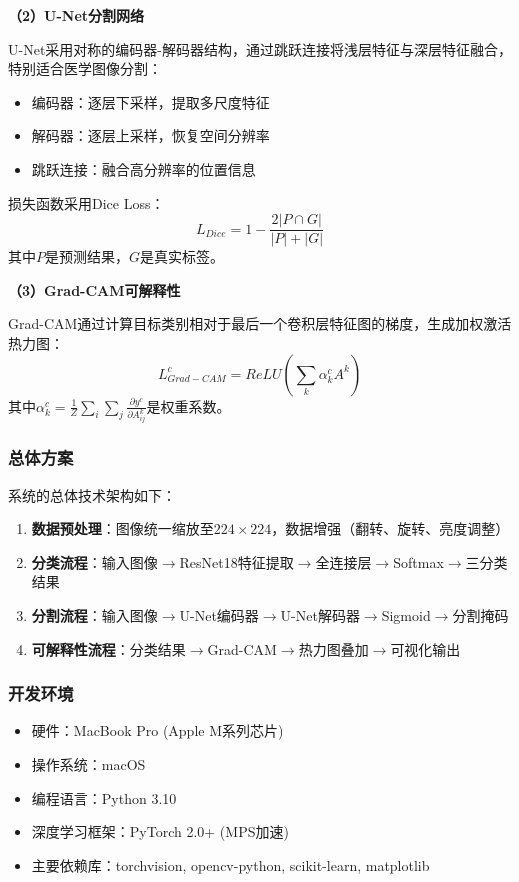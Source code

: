 \documentclass[supercite]{Hust-undergraduate-kaiti}
\theoremstyle{definition}
\begin{document}
\textbf{（2）U-Net分割网络}

U-Net采用对称的编码器-解码器结构，通过跳跃连接将浅层特征与深层特征融合，特别适合医学图像分割：
\begin{itemize}
    \item 编码器：逐层下采样，提取多尺度特征
    \item 解码器：逐层上采样，恢复空间分辨率
    \item 跳跃连接：融合高分辨率的位置信息
\end{itemize}

损失函数采用Dice Loss：
$$L_{Dice} = 1 - \frac{2|P \cap G|}{|P| + |G|}$$
其中$P$是预测结果，$G$是真实标签。

\textbf{（3）Grad-CAM可解释性}

Grad-CAM通过计算目标类别相对于最后一个卷积层特征图的梯度，生成加权激活热力图：
$$L_{Grad-CAM}^c = ReLU\left(\sum_k \alpha_k^c A^k\right)$$
其中$\alpha_k^c = \frac{1}{Z}\sum_i\sum_j \frac{\partial y^c}{\partial A_{ij}^k}$是权重系数。

\subsubsection{总体方案}

系统的总体技术架构如下：

\begin{enumerate}
    \item \textbf{数据预处理}：图像统一缩放至$224\times224$，数据增强（翻转、旋转、亮度调整）
    \item \textbf{分类流程}：输入图像$\rightarrow$ResNet18特征提取$\rightarrow$全连接层$\rightarrow$Softmax$\rightarrow$三分类结果
    \item \textbf{分割流程}：输入图像$\rightarrow$U-Net编码器$\rightarrow$U-Net解码器$\rightarrow$Sigmoid$\rightarrow$分割掩码
    \item \textbf{可解释性流程}：分类结果$\rightarrow$Grad-CAM$\rightarrow$热力图叠加$\rightarrow$可视化输出
\end{enumerate}

\subsubsection{开发环境}

\begin{itemize}
    \item 硬件：MacBook Pro (Apple M系列芯片)
    \item 操作系统：macOS
    \item 编程语言：Python 3.10
    \item 深度学习框架：PyTorch 2.0+ (MPS加速)
    \item 主要依赖库：torchvision, opencv-python, scikit-learn, matplotlib
\end{itemize}
\end{document}
